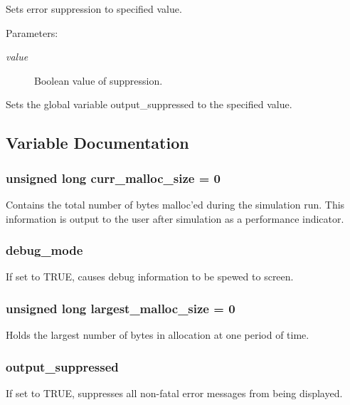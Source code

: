 Sets error suppression to specified value.

\begin{Desc}
\item[Parameters: ]\par
\begin{description}
\item[{\em 
value}]Boolean value of suppression.\end{description}
\end{Desc}
Sets the global variable output\_\-suppressed to the specified value. 

\subsection{Variable Documentation}
\subsubsection{\setlength{\rightskip}{0pt plus 5cm}unsigned long curr\_\-malloc\_\-size = 0}\label{util_8c_a2}


Contains the total number of bytes malloc'ed during the simulation run. This information is output to the user after simulation as a performance indicator. 
\subsubsection{ debug\_\-mode}\label{util_8c_a1}


If set to TRUE, causes debug information to be spewed to screen. 
\subsubsection{\setlength{\rightskip}{0pt plus 5cm}unsigned long largest\_\-malloc\_\-size = 0}\label{util_8c_a3}


Holds the largest number of bytes in allocation at one period of time. 
\subsubsection{ output\_\-suppressed}\label{util_8c_a0}


If set to TRUE, suppresses all non-fatal error messages from being displayed. 
